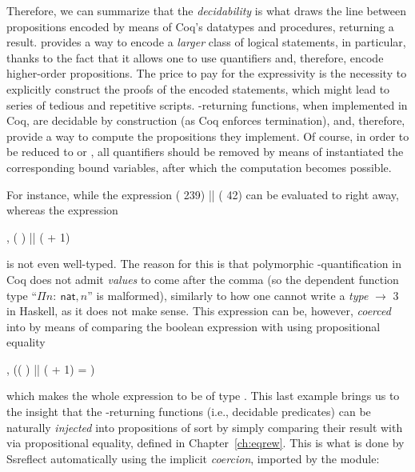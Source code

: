 Therefore, we can summarize that the \textit{decidability} is what draws the
line between propositions encoded by means of Coq's  datatypes
and procedures, returning a  result.  provides a way to
encode a \textit{larger} class of logical statements, in particular, thanks
to the fact that it allows one to use quantifiers and, therefore,
encode higher-order propositions. The price to pay for the
expressivity is the necessity to explicitly construct the proofs of
the encoded statements, which might lead to series of tedious and
repetitive scripts. -returning functions, when implemented in
Coq, are decidable by construction (as Coq enforces termination), and,
therefore, provide a way to compute the propositions they
implement. Of course, in order to be reduced to  or , all
quantifiers should be removed by means of instantiated the
corresponding bound variables, after which the computation becomes
possible.


For instance, while the expression ( 239) || ( 42) can be
evaluated to  right away, whereas the expression


\coqdoceol
\coqdocemptyline
\coqdocnoindent
\coqdockw{\ensuremath{\forall}} , ( ) ||  ( + 1)

\coqdocemptyline


is not even well-typed. The reason for this is that polymorphic
\coqdockw{\ensuremath{\forall}}-quantification in Coq does not admit \textit{values} to come after
the comma (so the dependent function type ``$\Pi{}n:~\textsf{nat}, n$''
is malformed), similarly to how one cannot write a \textit{type}  \ensuremath{\rightarrow} 3
in Haskell, as it does not make sense. This
expression can be, however, \textit{coerced} into  by means of
comparing the boolean expression with  using propositional
equality


\coqdoceol
\coqdocemptyline
\coqdocnoindent
\coqdockw{\ensuremath{\forall}} , (( ) ||  ( + 1) = )

\coqdocemptyline


which makes the whole expression to be of type . This last
example brings us to the insight that the -returning functions
(i.e., decidable predicates) can be naturally \textit{injected}
 into propositions of sort  by simply
comparing their result with  via propositional equality, defined
in Chapter~\ref{ch:eqrew}. This is what is done by Ssreflect
automatically using the implicit
\textit{coercion}, imported by the  module:


